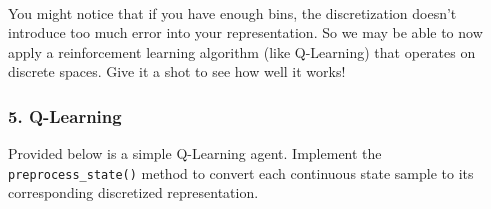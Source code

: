 \documentclass[11pt]{article}
\begin{document}
    \begin{center}
    \end{center}
    { \hspace*{\fill} \\}
    
    You might notice that if you have enough bins, the discretization
doesn't introduce too much error into your representation. So we may be
able to now apply a reinforcement learning algorithm (like Q-Learning)
that operates on discrete spaces. Give it a shot to see how well it
works!

\subsubsection{5. Q-Learning}\label{q-learning}

Provided below is a simple Q-Learning agent. Implement the
\texttt{preprocess\_state()} method to convert each continuous state
sample to its corresponding discretized representation.
\end{document}

